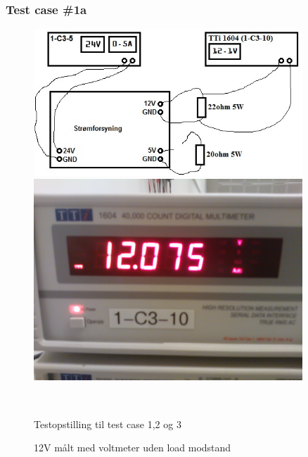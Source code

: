 \subsubsection{Test case \#1a}
\begin{figure}[htbp] \centering
\begin{minipage}[c]{0.48\textwidth} \centering
\includegraphics[width=0.9\textwidth]{billeder/test_power.jpg} 
\end{minipage} \hfill
\begin{minipage}[c]{0.48\textwidth} \centering
\includegraphics[width=0.9\textwidth]{billeder/12V_0A.jpg} 
\end{minipage} \\ 
\begin{minipage}[t]{0.48\textwidth}
\caption{Testopstilling til test case 1,2 og 3} 
\label{fig:testopstilling}
\end{minipage} \hfill
\begin{minipage}[t]{0.48\textwidth}
\caption{12V målt med voltmeter uden load modstand} 
\label{fig:udgang_12V_0A}
\end{minipage}
\end{figure}
